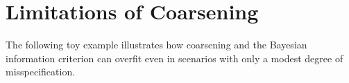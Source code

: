 \section{Limitations of Coarsening}
\label{sec:coarsening-limitations}

The following toy example illustrates how coarsening and the Bayesian information criterion can overfit even in scenarios with only a modest degree of misspecification.

